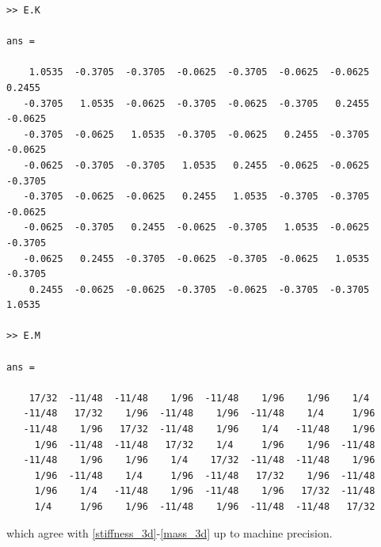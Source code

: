 \documentclass[a4paper]{article}
\begin{document}
\begin{lstlisting}
>> E.K

ans =

    1.0535  -0.3705  -0.3705  -0.0625  -0.3705  -0.0625  -0.0625   0.2455
   -0.3705   1.0535  -0.0625  -0.3705  -0.0625  -0.3705   0.2455  -0.0625
   -0.3705  -0.0625   1.0535  -0.3705  -0.0625   0.2455  -0.3705  -0.0625
   -0.0625  -0.3705  -0.3705   1.0535   0.2455  -0.0625  -0.0625  -0.3705
   -0.3705  -0.0625  -0.0625   0.2455   1.0535  -0.3705  -0.3705  -0.0625
   -0.0625  -0.3705   0.2455  -0.0625  -0.3705   1.0535  -0.0625  -0.3705
   -0.0625   0.2455  -0.3705  -0.0625  -0.3705  -0.0625   1.0535  -0.3705
    0.2455  -0.0625  -0.0625  -0.3705  -0.0625  -0.3705  -0.3705   1.0535
      
>> E.M

ans =

    17/32  -11/48  -11/48    1/96  -11/48    1/96    1/96    1/4
   -11/48   17/32    1/96  -11/48    1/96  -11/48    1/4     1/96
   -11/48    1/96   17/32  -11/48    1/96    1/4   -11/48    1/96    
     1/96  -11/48  -11/48   17/32    1/4     1/96    1/96  -11/48    
   -11/48    1/96    1/96    1/4    17/32  -11/48  -11/48    1/96    
     1/96  -11/48    1/4     1/96  -11/48   17/32    1/96  -11/48    
     1/96    1/4   -11/48    1/96  -11/48    1/96   17/32  -11/48    
     1/4     1/96    1/96  -11/48    1/96  -11/48  -11/48   17/32  
\end{lstlisting}

\noindent
which agree with \eqref{stiffness_3d}-\eqref{mass_3d} up to machine precision.
\end{document}
